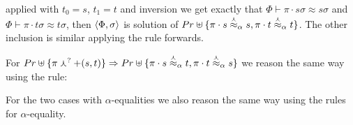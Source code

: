 \documentclass{article}
\begin{document}
\begin{prooftree}
\end{prooftree}

applied with $t_0 = s$, $t_1 = t$ and inversion we get exactly that
$\Phi \vdash \pi \cdot s\sigma \approx s\sigma$ and $\Phi \vdash \pi
\cdot t\sigma \approx t\sigma$, then $\sol{\Phi}{\sigma}$ is solution of
$Pr \uplus \{ \pi \cdot s \eqq s, \pi \cdot t \eqq t\}$.
The other inclusion is similar applying the rule forwards.

For $Pr \uplus \{ \pi \curlywedge^{?} +(s,t) \}
\Rightarrow Pr \uplus \{ \pi \cdot s \eqq t, \pi \cdot t \eqq s\}$
we reason the same way using the rule:

\begin{prooftree}
\end{prooftree}

For the two cases with $\alpha$-equalities we also reason the same way
using the rules for $\alpha$-equality.

\newpage
 
\end{document}
